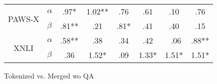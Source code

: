 {{\begin{tabular}{llcc|cc|cc}
    \multicolumn{1}{c}{\multirow{2}{*}{PAWS-X}}  & $\alpha$  & \multicolumn{1}{c|}{\cellcolor{yellow} .97*}    & \multicolumn{1}{c|}{\cellcolor{purple} 1.02**} & \multicolumn{1}{c|}{\cellcolor{yellow} .76}       & \multicolumn{1}{c|}{\cellcolor{purple} .61}    & \multicolumn{1}{c|}{\cellcolor{purple} .10}   & \multicolumn{1}{c}{\cellcolor{purple} .76}      \\
    \multicolumn{1}{c}{}                         & $\beta$   & \multicolumn{1}{c|}{\cellcolor{yellow} .81**}   & \multicolumn{1}{c|}{\cellcolor{yellow} .21}    & \multicolumn{1}{c|}{\cellcolor{yellow} .81*}      & \multicolumn{1}{c|}{\cellcolor{yellow} .41}    & \multicolumn{1}{c|}{\cellcolor{purple} .40}   & \multicolumn{1}{c}{\cellcolor{purple} .15}      \\ \cline{3-8}
    \multicolumn{1}{c}{\multirow{2}{*}{XNLI}}    & $\alpha$  & \multicolumn{1}{c|}{\cellcolor{yellow} .58**}   & \multicolumn{1}{c|}{\cellcolor{yellow} .38}    & \multicolumn{1}{c|}{\cellcolor{yellow} .34}       & \multicolumn{1}{c|}{\cellcolor{yellow} .42}    & \multicolumn{1}{c|}{\cellcolor{yellow} .06}   & \multicolumn{1}{c}{\cellcolor{yellow} .88**}    \\
    \multicolumn{1}{c}{}                         & $\beta$   & \multicolumn{1}{c|}{\cellcolor{yellow} .36}     & \multicolumn{1}{c|}{\cellcolor{purple} 1.52*}  & \multicolumn{1}{c|}{\cellcolor{yellow} .09}       & \multicolumn{1}{c|}{\cellcolor{yellow} 1.33*}  & \multicolumn{1}{c|}{\cellcolor{yellow} 1.51*} & \multicolumn{1}{c}{\cellcolor{purple} 1.51*}    \\
    \end{tabular}
  }
}{Tokenized vs. Merged wo QA}

